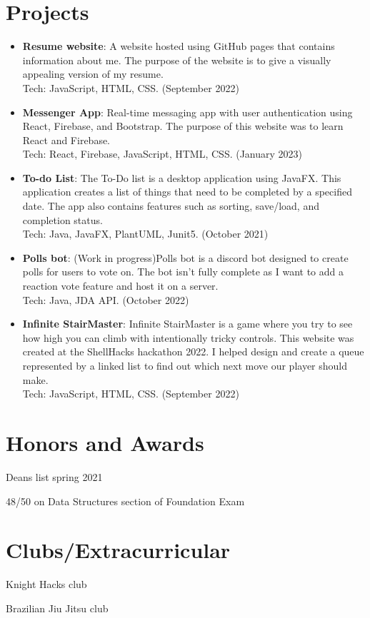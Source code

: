 \documentclass[a4paper,20pt]{article}
\newcommand{\resumeItem}[2]{
  \item\normalsize{
    \textbf{#1}{: #2 \vspace{1pt}}
  }
}
\newcommand{\resumeSubItem}[2]{\resumeItem{#1}{#2}\vspace{1pt}}
\newcommand{\resumeSubHeadingListStart}{\begin{itemize}[leftmargin=*]}
\newcommand{\resumeSubHeadingListEnd}{\end{itemize}}
\begin{document}
    
    \section{Projects}
        \resumeSubHeadingListStart
            \resumeSubItem{Resume website}{A website hosted using GitHub pages that contains information about me. The purpose of the website is to give a visually appealing version of my resume.\\Tech: JavaScript, HTML, CSS. (September 2022)}
            \resumeSubItem{Messenger App}{Real-time messaging app with user authentication using React, Firebase, and Bootstrap. The purpose of this website was to learn React and Firebase.
            \\Tech: React, Firebase, JavaScript, HTML, CSS. (January 2023)}
            \resumeSubItem{To-do List}{The To-Do list is a desktop application using JavaFX. This application creates a list of things that need to be completed by a specified date. The app also contains features such as sorting, save/load, and completion status.  \\Tech: Java, JavaFX, PlantUML, Junit5. (October 2021)}
            \resumeSubItem{Polls bot}{(Work in progress)Polls bot is a discord bot designed to create polls for users to vote on. The bot isn't fully complete as I want to add a reaction vote feature and host it on a server.\\Tech: Java, JDA API. (October 2022)}
            \resumeSubItem{Infinite StairMaster}{Infinite StairMaster is a game where you try to see how high you can climb with intentionally tricky controls. This website was created at the ShellHacks hackathon 2022. I helped design and create a queue represented by a linked list to find out which next move our player should make. \\Tech: JavaScript, HTML, CSS. (September 2022)}
            \vspace{2pt}
        \resumeSubHeadingListEnd
    
    
    \section{Honors and Awards}
        \begin{description}[font=$\bullet$]
            \item {Deans list spring 2021}
            \item {48/50 on Data Structures section of Foundation Exam}
        \end{description}
        
    \section{Clubs/Extracurricular}
        \begin{description}[font=$\bullet$]
            \item {Knight Hacks club}
            \item {Brazilian Jiu Jitsu club}
        \end{description}
        
\end{document}
